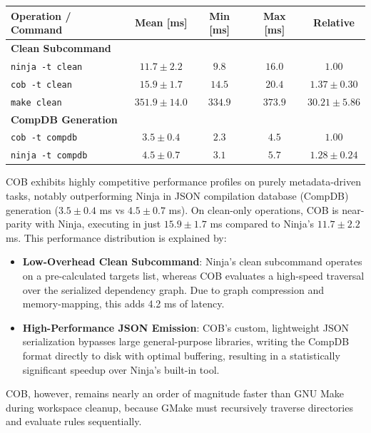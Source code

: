 \documentclass[11pt]{article}
\begin{document}
\begin{center}
\renewcommand{\arraystretch}{1.2}
\begin{tabular}{@{}lcccc@{}}
\toprule
\textbf{Operation / Command} & \textbf{Mean [ms]} & \textbf{Min [ms]} & \textbf{Max [ms]} & \textbf{Relative} \\
\midrule
\textbf{Clean Subcommand} & & & & \\
\quad\texttt{ninja -t clean} & $11.7 \pm 2.2$ & $9.8$ & $16.0$ & $1.00$ \\
\quad\texttt{cob -t clean}   & $15.9 \pm 1.7$ & $14.5$ & $20.4$ & $1.37 \pm 0.30$ \\
\quad\texttt{make clean}      & $351.9 \pm 14.0$ & $334.9$ & $373.9$ & $30.21 \pm 5.86$ \\
\midrule
\textbf{CompDB Generation} & & & & \\
\quad\texttt{cob -t compdb}   & $3.5 \pm 0.4$ & $2.3$ & $4.5$ & $1.00$ \\
\quad\texttt{ninja -t compdb} & $4.5 \pm 0.7$ & $3.1$ & $5.7$ & $1.28 \pm 0.24$ \\
\bottomrule
\end{tabular}
\end{center}

COB exhibits highly competitive performance profiles on purely metadata-driven tasks, notably outperforming Ninja in
JSON compilation database (CompDB) generation ($3.5 \pm 0.4$ ms vs $4.5 \pm 0.7$ ms). On clean-only operations, COB is
near-parity with Ninja, executing in just $15.9 \pm 1.7$ ms compared to Ninja's $11.7 \pm 2.2$ ms. This performance
distribution is explained by:

\begin{itemize}
    \item \textbf{Low-Overhead Clean Subcommand}: Ninja's clean subcommand operates on a pre-calculated targets list, whereas COB evaluates a high-speed traversal over the serialized dependency graph. Due to graph compression and memory-mapping, this adds 4.2 ms of latency.
    \item \textbf{High-Performance JSON Emission}: COB's custom, lightweight JSON serialization bypasses large general-purpose libraries, writing the CompDB format directly to disk with optimal buffering, resulting in a statistically significant speedup over Ninja's built-in tool.
\end{itemize}
COB, however, remains nearly an order of magnitude faster than GNU Make during workspace cleanup, because GMake must recursively traverse directories and evaluate rules sequentially.
\end{document}
